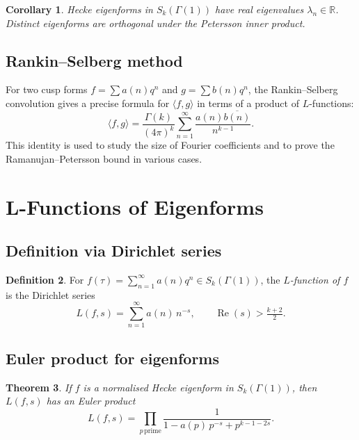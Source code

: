 \documentclass[12pt,a4paper]{amsart}
\newtheorem{theorem}{Theorem}[section]
\newtheorem{corollary}[theorem]{Corollary}
\theoremstyle{definition}
\newtheorem{definition}[theorem]{Definition}
\begin{document}
\begin{corollary}
  Hecke eigenforms in $S_k(\Gamma(1))$ have real eigenvalues $\lambda_n \in \mathbb{R}$.
  Distinct eigenforms are orthogonal under the Petersson inner product.
\end{corollary}

\subsection{Rankin--Selberg method}

For two cusp forms $f = \sum a(n)q^n$ and $g = \sum b(n)q^n$, the
Rankin--Selberg convolution gives a precise formula for $\langle f, g \rangle$
in terms of a product of $L$-functions:
\[
  \langle f, g \rangle = \frac{\Gamma(k)}{(4\pi)^k}
  \sum_{n=1}^{\infty} \frac{a(n)\overline{b(n)}}{n^{k-1}}.
\]
This identity is used to study the size of Fourier coefficients and
to prove the Ramanujan--Petersson bound in various cases.

\section{L-Functions of Eigenforms}

\subsection{Definition via Dirichlet series}

\begin{definition}
  For $f(\tau) = \sum_{n=1}^{\infty} a(n)q^n \in S_k(\Gamma(1))$, the
  \emph{$L$-function of $f$} is the Dirichlet series
  \[
    L(f,s) = \sum_{n=1}^{\infty} a(n)\,n^{-s}, \qquad \operatorname{Re}(s) > \tfrac{k+2}{2}.
  \]
\end{definition}

\subsection{Euler product for eigenforms}

\begin{theorem}\label{thm:euler-product}
  If $f$ is a normalised Hecke eigenform in $S_k(\Gamma(1))$, then $L(f,s)$
  has an Euler product
  \[
    L(f,s) = \prod_{p\,\text{prime}} \frac{1}{1 - a(p)\,p^{-s} + p^{k-1-2s}}.
  \]
\end{theorem}
\end{document}
